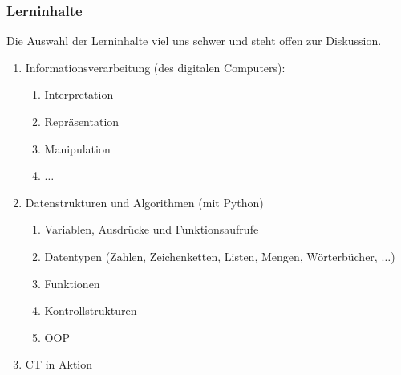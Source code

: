 \documentclass[german,aspectratio=169]{beamer}
\begin{document}
\begin{frame}
	\frametitle{Lerninhalte}
	Die Auswahl der Lerninhalte viel uns schwer und steht offen zur Diskussion.
	\begin{enumerate}[label=(\arabic*)]
		\item Informationsverarbeitung (des digitalen Computers): 
		\begin{enumerate}[label=$\bullet$]
			\item Interpretation
			\item Repräsentation
			\item Manipulation
			\item $\ldots$
		\end{enumerate}
		\item Datenstrukturen und Algorithmen (mit Python)
			\begin{enumerate}[label=$\bullet$]
			\item Variablen, Ausdrücke und Funktionsaufrufe
			\item Datentypen (Zahlen, Zeichenketten, Listen, Mengen, Wörterbücher, $\ldots$)
			\item Funktionen
			\item Kontrollstrukturen
			\item OOP
		\end{enumerate}
		\item CT in Aktion
	\end{enumerate}
\end{frame}
\end{document}
